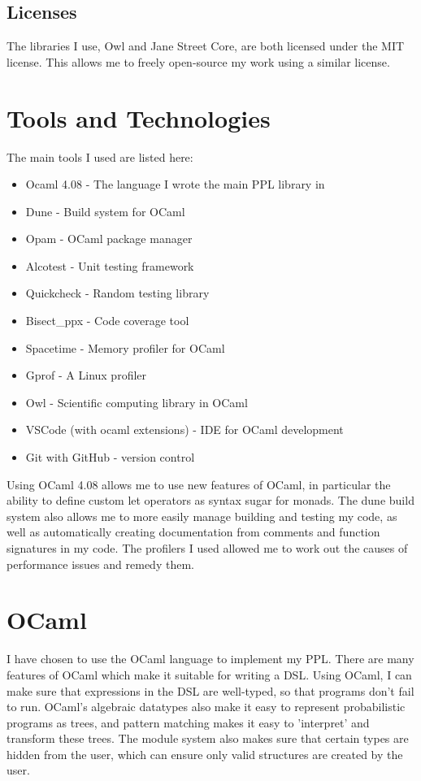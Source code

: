\subsection{Licenses}

The libraries I use, Owl and Jane Street Core, are both licensed under the MIT license. This allows me to freely open-source my work using a similar license.
\section{Tools and Technologies}
The main tools I used are listed here:
\begin{itemize}
	\item Ocaml 4.08 - The language I wrote the main PPL library in
	\item Dune - Build system for OCaml
	\item Opam - OCaml package manager
	\item Alcotest - Unit testing framework
	\item Quickcheck - Random testing library
	\item Bisect\_ppx - Code coverage tool
	\item Spacetime - Memory profiler for OCaml
	\item Gprof - A Linux profiler
	\item Owl - Scientific computing library in OCaml
	\item VSCode (with ocaml extensions) - IDE for OCaml development
	\item Git with GitHub - version control
\end{itemize}

Using OCaml 4.08 allows me to use new features of OCaml, in particular the ability to define custom let operators as syntax sugar for monads. The dune build system also allows me to more easily manage building and testing my code, as well as automatically creating documentation from comments and function signatures in my code. The profilers I used allowed me to work out the causes of performance issues and remedy them.

\section{OCaml}
I have chosen to use the OCaml language to implement my PPL. There are many features of OCaml which make it suitable for writing a DSL. Using OCaml, I can make sure that expressions in the DSL are well-typed, so that programs don't fail to run. OCaml's algebraic datatypes also make it easy to represent probabilistic programs as trees, and pattern matching makes it easy to 'interpret' and transform these trees. The module system also makes sure that certain types are hidden from the user, which can ensure only valid structures are created by the user.

